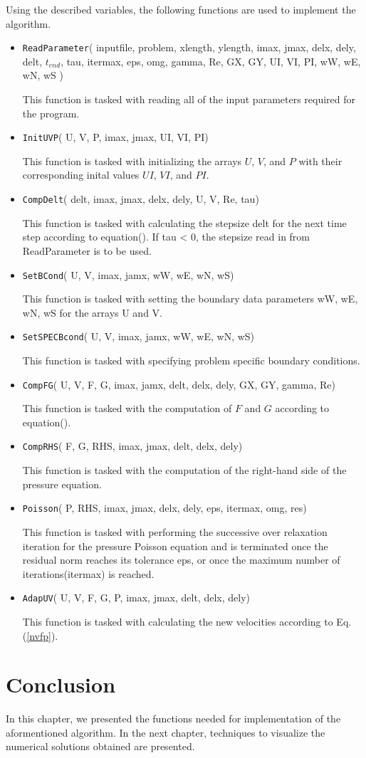 Using the described variables, the following functions are used to implement the algorithm.

\begin{itemize}
	
	\item \texttt{ReadParameter}( inputfile, problem, xlength, ylength, imax, jmax, delx, dely, delt, $t_{end}$, tau, itermax, eps, omg, gamma, Re, GX, GY, UI, VI, PI, wW, wE, wN, wS ) 

This function is tasked with reading all of the input parameters required for the program.

	\item \texttt{InitUVP}( U, V, P, imax, jmax, UI, VI, PI)

This function is tasked with initializing the arrays $U$, $V$, and $P$ with their corresponding inital values $UI$, $VI$, and $PI$.

	\item \texttt{CompDelt}( delt, imax, jmax, delx, dely, U, V, Re, tau)
	
This function is tasked with calculating the stepsize delt for the next time step according to equation(). If tau < 0, the stepsize read in from ReadParameter is to be used.

	\item \texttt{SetBCond}( U, V, imax, jamx, wW, wE, wN, wS)
	
This function is tasked with setting the boundary data parameters wW, wE, wN, wS for the arrays U and V.

	\item \texttt{SetSPECBcond}( U, V, imax, jamx, wW, wE, wN, wS)
	
This function is tasked with specifying problem specific boundary conditions. 

	\item \texttt{CompFG}( U, V, F, G, imax, jamx, delt, delx, dely, GX, GY, gamma, Re)
	
This function is tasked with the computation of $F$ and $G$ according to equation().

	\item \texttt{CompRHS}( F, G, RHS, imax, jmax, delt, delx, dely) 
	
This function is tasked with the computation of the right-hand side of the pressure equation.

	\item \texttt{Poisson}( P, RHS, imax, jmax, delx, dely, eps, itermax, omg, res)
	
This function is tasked with performing the successive over relaxation iteration for the pressure Poisson equation and is terminated once the residual norm reaches its tolerance eps, or once the maximum number of iterations(itermax) is reached.

	\item \texttt{AdapUV}( U, V, F, G, P, imax, jmax, delt, delx, dely)
	
This function is tasked with calculating the new velocities according to Eq. (\ref{nvfp}).
	
\end{itemize} 


\section{Conclusion}

In this chapter, we presented the functions needed for implementation of the aformentioned algorithm. In the next chapter, techniques to visualize the numerical solutions obtained are presented.
%
